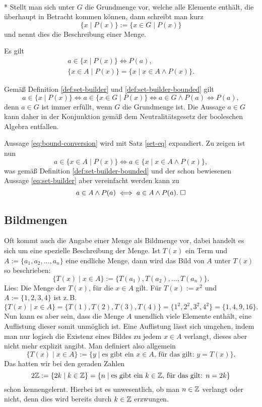 \begin{Definition}%
\label{def:set-builder}\mbox{}\\*
Stellt man sich unter $G$ die Grundmenge vor, welche
alle Elemente enthält, die überhaupt in Betracht kommen können,
dann schreibt man kurz%
\[\{x\mid P(x)\} := \{x\in G\mid P(x)\}\]
und nennt dies die Beschreibung einer Menge.
\end{Definition}
\begin{Satz}
Es gilt
\begin{gather}
\label{eq:set-builder}
a\in\{x\mid P(x)\}\iff P(a),\\
\label{eq:bound-conversion}
\{x\in A\mid P(x)\} = \{x\mid x\in A\land P(x)\}.
\end{gather}
\end{Satz}
 Gemäß Definition \ref{def:set-builder}
und \ref{def:set-builder-bounded} gilt%
\[a\in\{x\mid P(x)\} \iff a\in\{x\in G\mid P(x)\}
\iff a\in G\land P(a)\iff P(a),\]
denn $a\in G$ ist immer erfüllt, wenn $G$ die Grundmenge ist.
Die Aussage $a\in G$ kann daher in der Konjunktion gemäß dem
Neutralitätsgesetz der booleschen Algebra entfallen.

Aussage \eqref{eq:bound-conversion} wird mit Satz \ref{set-eq}
expandiert. Zu zeigen ist nun
\[a\in\{x\in A\mid P(x)\}\iff a\in\{x\mid x\in A\land P(x)\},\]
was gemäß Definition \ref{def:set-builder-bounded} und der schon
bewiesenen Aussage \eqref{eq:set-builder} aber vereinfacht
werden kann zu
\[a\in A\land P(a)\iff a\in A\land P(a).\;\Box\]


\subsection{Bildmengen}

Oft kommt auch die Angabe einer Menge als Bildmenge vor, dabei
handelt es sich um eine spezielle Beschreibung der Menge. Ist
$T(x)$ ein Term und $A:=\{a_1,a_2,\ldots,a_n\}$ eine endliche
Menge, dann wird das Bild von $A$ unter $T(x)$ so beschrieben:
\[\{T(x)\mid x\in A\} := \{T(a_1),T(a_2),\ldots, T(a_n)\}.\]
Lies: Die Menge der $T(x)$, für die $x\in A$ gilt.
Für $T(x):=x^2$ und $A:=\{1,2,3,4\}$ ist z.\,B.
\[\{T(x)\mid x\in A\} = \{T(1), T(2), T(3), T(4)\}
= \{1^2,2^2,3^2,4^2\} = \{1,4,9,16\}.\]
Nun kann es aber sein, dass die Menge $A$ unendlich viele Elemente
enthält, eine Auflistung dieser somit unmöglich ist. Eine Auflistung
lässt sich umgehen, indem man nur logisch die Existenz eines Bildes
zu jedem $x\in A$ verlangt, dieses aber nicht mehr explizit angibt.
Man definiert also allgemein
\[\{T(x)\mid x\in A\} := \{y\mid\text{es gibt ein $x\in A$, für das gilt: $y=T(x)$}\}.\]
Das hatten wir bei den geraden Zahlen
\[2\mathbb Z := \{2k\mid k\in\mathbb Z\} = \{n\mid\text{es gibt ein $k\in\mathbb Z$, für das gilt: $n=2k$}\}\]
schon kennengelernt. Hierbei ist es unwesentlich, ob man $n\in\mathbb Z$ verlangt
oder nicht, denn dies wird bereits durch $k\in\mathbb Z$ erzwungen.

